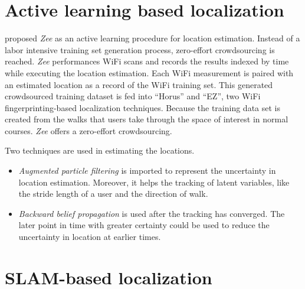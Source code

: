 \documentclass[letterpaper]{article}
\begin{document}
\section{Active learning based localization}

\cite{Rai:2012:ZZC:2348543.2348580} proposed \emph{Zee} as an active learning procedure for location estimation.
Instead of a labor intensive training set generation process, zero-effort crowdsourcing is reached.
\emph{Zee} performances WiFi scans and records the results indexed by time while executing the location estimation.
Each WiFi measurement is paired with an estimated location as a record of the WiFi training set.
This generated crowdsourced training dataset is fed into ``Horus'' and ``EZ'', two WiFi fingerprinting-based localization techniques.
Because the training data set is created from the walks that users take through the space of interest in normal courses.
\emph{Zee} offers a zero-effort crowdsourcing.

Two techniques are used in estimating the locations.
\begin{itemize}
\item \emph{Augmented particle filtering} is imported to represent the uncertainty in location estimation.
Moreover, it helps the tracking of latent variables, like the stride length of a user and the direction of walk.
\item \emph{Backward belief propagation} is used after the tracking has converged.
The later point in time with greater certainty could be used to reduce the uncertainty in location at earlier times.
\end{itemize}





\section{SLAM-based localization}
\end{document}
